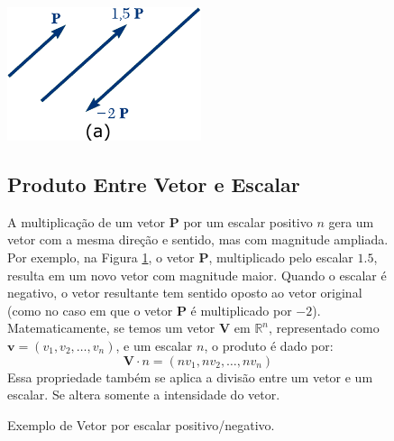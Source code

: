 \documentclass[a4paper, 14pt, twoside]{article}
\begin{document}
\newpage


\begin{figure}[h]
    \begin{minipage}[t]{0.35\textwidth}
        \vspace{0pt} %
        \centering
        \includegraphics[width=0.8\linewidth]{Figuras/produtovetorescalar.pdf}
        \caption{Exemplo de Vetor por escalar positivo/negativo.}
        \label{fig:vetor-escalar}
    \end{minipage}
    \vspace*{-3cm}
    \begin{minipage}[t]{0.60\textwidth}
        \vspace{0pt} %
        \subsection{Produto Entre Vetor e Escalar}
        \begin{tcolorbox}[colframe=lockheed, colback=white, title=Produto Entre Vetor e Escalar, fonttitle=\bfseries]
        A multiplicação de um vetor \textbf{P} por um escalar positivo $n$ gera um vetor com a mesma direção e sentido, mas com magnitude ampliada. Por exemplo, na Figura \ref{fig:vetor-escalar}, o vetor \textbf{P}, multiplicado pelo escalar $1.5$, resulta em um novo vetor com magnitude maior. Quando o escalar é negativo, o vetor resultante tem sentido oposto ao vetor original (como no caso em que o vetor \textbf{P} é multiplicado por $-2$).
        Matematicamente, se temos um vetor $\mathbf{V}$ em $\mathbb{R}^n$, representado como $\mathbf{v} = (v_1, v_2, \ldots, v_n)$, e um escalar $n$, o produto é dado por:
        \[ \mathbf{V} \cdot n = (nv_1, nv_2, \ldots, nv_n) \]
        Essa propriedade também se aplica a divisão entre um vetor e um escalar. Se altera somente a intensidade do vetor.
    \end{tcolorbox}
\end{minipage}



\end{figure}
\end{document}
